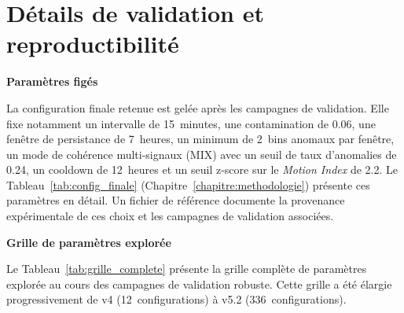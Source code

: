 \chapter{Détails de validation et reproductibilité}
\label{annexe:validation}

\newcommand{\annexeheading}[1]{%
  \par\medskip
  \noindent\textbf{#1}\par\smallskip
}

\annexeheading{Paramètres figés}

La configuration finale retenue est gelée après les campagnes de validation. Elle fixe
notamment un intervalle de 15~minutes, une contamination de 0.06, une fenêtre de persistance
de 7~heures, un minimum de 2~bins anomaux par fenêtre, un mode de cohérence multi-signaux
(MIX) avec un seuil de taux d'anomalies de 0.24, un cooldown de 12~heures et un seuil
z-score sur le \textit{Motion Index} de 2.2. Le Tableau~\ref{tab:config_finale}
(Chapitre~\ref{chapitre:methodologie}) présente ces paramètres en détail. Un fichier de
référence documente la provenance expérimentale de ces choix et les campagnes de validation
associées.

\annexeheading{Grille de paramètres explorée}

Le Tableau~\ref{tab:grille_complete} présente la grille complète de paramètres explorée au
cours des campagnes de validation robuste. Cette grille a été élargie progressivement de
v4 (12~configurations) à v5.2 (336~configurations).

